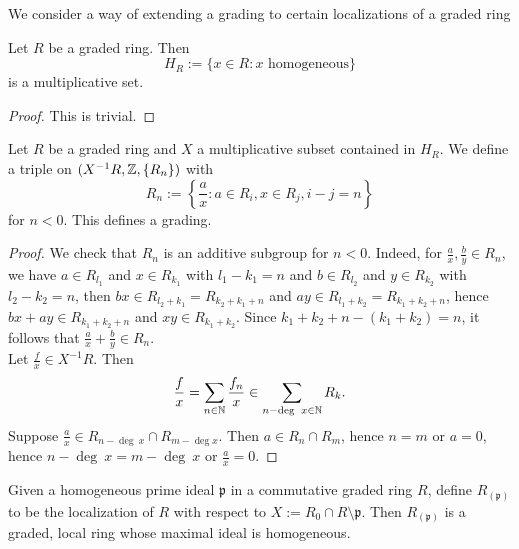     We consider a way of extending a grading to certain localizations of a graded ring 
    \begin{lemma}
        Let $R$ be a graded ring. Then 
        $$
            H_R:= \{x\in R:x \text{ homogeneous}\}
        $$
        is a multiplicative set. 
    \end{lemma}
    \begin{proof}
        This is trivial. 
    \end{proof}
    \begin{lemma}\label{LocalizationOfGradedRing}
        Let $R$ be a graded ring and $X$ a multiplicative subset contained in $H_R$. We define a triple on $(X^{-1}R, \mathbb{Z}, \{R_n\})$ with 
        $$
            R_n := \left\{\frac{a}{x} : a\in R_i, x\in R_{j}, i-j=n \right\}
        $$
        for $n<0$. This defines a grading.
    \end{lemma}
    \begin{proof}
        We check that $R_n$ is an additive subgroup for $n<0$. Indeed, for $\frac{a}{x},\frac{b}{y}\in R_n$, we have $a\in R_{l_1}$ and $x\in R_{k_1}$ with $l_1-k_1 = n$ and $b\in R_{l_2}$ and $y\in R_{k_2}$ with $l_2-k_2=n$, then $bx\in R_{l_2+k_1}=R_{k_2+k_1+n}$ and $ay\in R_{l_1+k_2}=R_{k_1+k_2+n}$, hence $bx+ay\in R_{k_1+k_2+n}$ and $xy\in R_{k_1+k_2}$. Since $k_1+k_2+n-(k_1+k_2)=n$, it follows that $\frac{a}{x}+\frac{b}{y}\in R_n$.\\
        Let $\frac{f}{x}\in X^{-1}R$. Then
        $$
            \frac{f}{x} = \sum_{n\in \mathbb{N}} \frac{f_n}{x} \in \sum_{n-\deg \ x \in \mathbb{N}} R_k.  
        $$ 
        Suppose $\frac{a}{x}\in R_{n-\deg \ x}\cap R_{m-\deg x}$. Then $a\in R_n\cap R_m$, hence $n=m$ or $a=0$, hence $n-\deg \ x = m-\deg \ x$ or $\frac{a}{x} = 0$.
    \end{proof}
    \begin{lemma}
        Given a homogeneous prime ideal $\mathfrak{p}$ in a commutative graded ring $R$, define $R_{(\mathfrak{p})}$ to be the localization of $R$ with respect to $X:=R_0\cap R\setminus \mathfrak{p}$. Then $R_{(\mathfrak{p})}$ is a graded, local ring whose maximal ideal is homogeneous. 
    \end{lemma}
